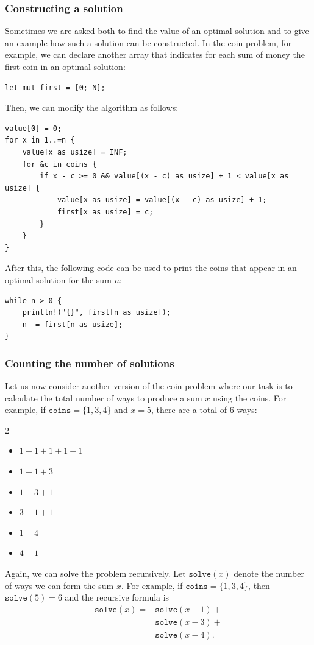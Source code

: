 \subsubsection{Constructing a solution}

Sometimes we are asked both to find the value
of an optimal solution and to give
an example how such a solution can be constructed.
In the coin problem, for example,
we can declare another array
that indicates for
each sum of money the first coin 
in an optimal solution:
\begin{lstlisting}
let mut first = [0; N];
\end{lstlisting}
Then, we can modify the algorithm as follows:
\begin{lstlisting}
value[0] = 0;
for x in 1..=n {
    value[x as usize] = INF;
    for &c in coins {
        if x - c >= 0 && value[(x - c) as usize] + 1 < value[x as usize] {
            value[x as usize] = value[(x - c) as usize] + 1;
            first[x as usize] = c;
        }
    }
}
\end{lstlisting}
After this, the following code can be used to
print the coins that appear in an optimal solution for
the sum $n$:
\begin{lstlisting}
while n > 0 {
    println!("{}", first[n as usize]);
    n -= first[n as usize];
}
\end{lstlisting}

\subsubsection{Counting the number of solutions}

Let us now consider another version
of the coin problem where our task is to
calculate the total number of ways
to produce a sum $x$ using the coins.
For example, if $\texttt{coins}=\{1,3,4\}$ and
$x=5$, there are a total of 6 ways:

\begin{multicols}{2}
\begin{itemize}
\item $1+1+1+1+1$
\item $1+1+3$
\item $1+3+1$
\item $3+1+1$
\item $1+4$
\item $4+1$
\end{itemize}
\end{multicols}

Again, we can solve the problem recursively.
Let $\texttt{solve}(x)$ denote the number of ways
we can form the sum $x$.
For example, if $\texttt{coins}=\{1,3,4\}$,
then $\texttt{solve}(5)=6$ and the recursive formula is
\begin{equation*}
\begin{split}
\texttt{solve}(x) = & \texttt{solve}(x-1) + \\
                    & \texttt{solve}(x-3) + \\
                    & \texttt{solve}(x-4)  .
\end{split}
\end{equation*}

